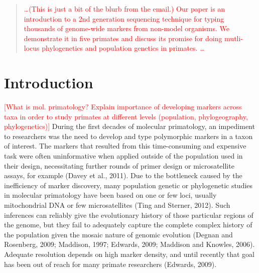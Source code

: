 \documentclass[12pt]{article}
\begin{document}
\maketitle

\begin{abstract}
\textcolor{red}{\ldots (This is just a bit of the blurb from the email.) Our paper is an introduction to a 2nd generation sequencing technique for typing thousands of genome-wide markers from non-model organisms.  We demonstrate it in five primates and discuss its promise for doing mutli-locus phylogenetics and population genetics in primates. \ldots}
\end{abstract}

\section{Introduction}

\textcolor{red}{[What is mol. primatology? Explain importance of developing markers across taxa in order to study primates at different levels (population, phylogeography, phylogenetics)]} During the first decades of molecular primatology, an impediment to researchers was the need to develop and type polymorphic markers in a taxon of interest. The markers that resulted from this time-consuming and expensive task were often uninformative when applied outside of the population used in their design, necessitating further rounds of primer design or microsatellite assays, for example (Davey et al., 2011). Due to the bottleneck caused by the inefficiency of marker discovery, many population genetic or phylogenetic studies in molecular primatology have been based on one or few loci, usually mitochondrial DNA or few microsatellites (Ting and Sterner, 2012). Such inferences can reliably give the evolutionary history of those particular regions of the genome, but they fail to adequately capture the complete complex history of the population given the mosaic nature of genomic evolution (Degnan and Rosenberg, 2009; Maddison, 1997; Edwards, 2009; Maddison and Knowles, 2006). Adequate resolution depends on high marker density, and until recently that goal has been out of reach for many primate researchers (Edwards, 2009).
\end{document}
